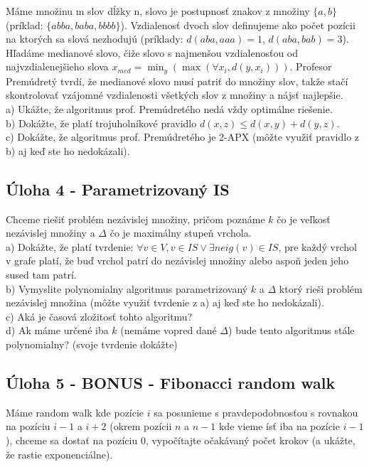 \documentclass[a4paper]{article}
\begin{document}
Máme množinu m slov dĺžky n, slovo je postupnosť znakov z množiny $\{a,b\}$ (príklad: $\{abba, baba, bbbb\}$). Vzdialenosť dvoch slov definujeme ako počet pozícii na ktorých sa slová nezhodujú (príklady: $d(aba, aaa) = 1$, $d(aba, bab) = 3$). Hľadáme medianové slovo, čiže slovo s najmenšou vzdialenosťou od najvzdialenejšieho slova $x_{med} = \min_y(\max(\forall x_i, d(y, x_i)))$. Profesor Premúdretý tvrdí, že medianové slovo musí patriť do množiny slov, takže stačí skontrolovať vzájomné vzdialenosti všetkých slov z množiny a nájsť najlepšie.
\\

a) Ukážte, že algoritmus prof. Premúdretého nedá vždy optimálne riešenie.
\\

b) Dokážte, že platí trojuholníkové pravidlo $d(x,z) \leq d(x,y) + d(y,z)$.
\\

c) Dokážte, že algoritmus prof. Premúdretého je 2-APX (môžte využiť pravidlo z b) aj keď ste ho nedokázali).

\subsection*{Úloha 4 - Parametrizovaný IS}

Chceme riešiť problém nezávislej množiny, pričom poznáme $k$ čo je veľkosť nezávislej množiny a $\Delta$ čo je maximálny stupeň vrchola. 
\\

a) Dokážte, že platí tvrdenie: $\forall v \in V, v \in IS \lor \exists neig(v) \in IS $, pre každý vrchol v grafe platí, že buď vrchol patrí do nezávislej množiny alebo aspoň jeden jeho sused tam patrí.
\\

b) Vymyslite polynomialny algoritmus parametrizovaný $k$ a $\Delta$ ktorý rieši problém nezávislej množina (môžte využiť tvrdenie z a) aj keď ste ho nedokázali).
\\

c) Aká je časová zložitosť tohto algoritmu?
\\

d) Ak máme určené iba $k$ (nemáme vopred dané $\Delta$) bude tento algoritmus stále polynomialny? (svoje tvrdenie dokážte)

\subsection*{Úloha 5 - BONUS - Fibonacci random walk}

Máme random walk kde  pozície $i$ sa posunieme s pravdepodobnosťou s rovnakou na pozíciu $i-1$ a $i+2$ (okrem pozícii $n$ a $n-1$ kde vieme ísť iba na pozície $i-1$), chceme sa dostať na pozíciu 0, vypočítajte očakávaný počet krokov (a ukážte, že rastie exponenciálne).
\end{document}
